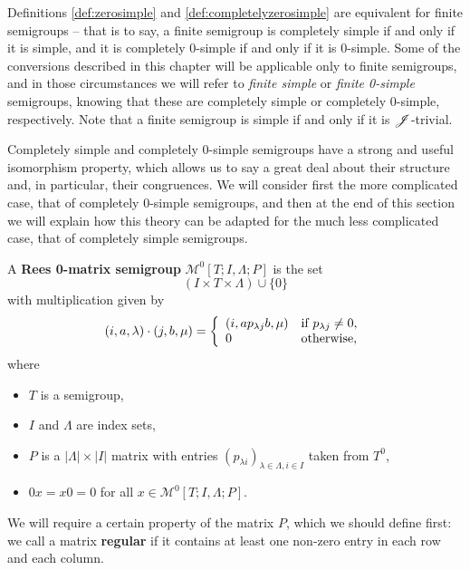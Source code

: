 Definitions \ref{def:zerosimple} and \ref{def:completelyzerosimple} are
equivalent for finite semigroups -- that is to say, a finite semigroup is
completely simple if and only if it is simple, and it is completely 0-simple if
and only if it is 0-simple.  Some of the conversions described in this chapter
will be applicable only to finite semigroups, and in those circumstances we will
refer to \textit{finite simple} or \textit{finite 0-simple} semigroups, knowing
that these are completely simple or completely 0-simple, respectively.
Note that a finite semigroup is simple if and only if it is $\mathrel{\mathscr{J}}$-trivial.

Completely simple and completely 0-simple semigroups have a strong and useful
isomorphism property, which allows us to say a great deal about their structure
and, in particular, their congruences.  We will consider first the more
complicated case, that of completely 0-simple semigroups, and then at the end of
this section we will explain how this theory can be adapted for the much less
complicated case, that of completely simple semigroups.

\begin{definition}
  \label{def:rzms}
  A \textbf{Rees 0-matrix semigroup} $\mathcal{M}^0[T;I,\Lambda;P]$ is the set
  $$(I \times T \times \Lambda) \cup \{0\}$$
  with multiplication given by
  $$(i,a,\lambda) \cdot (j,b,\mu) = \left\{
    \begin{array}{l l}
      (i,ap_{\lambda j}b, \mu) & \text{if~} p_{\lambda j} \neq 0, \\
      0 & \text{otherwise,}
    \end{array}
  \right.$$
  where
  \begin{itemize}
  \item $T$ is a semigroup,
  \item $I$ and $\Lambda$ are index sets,
  \item $P$ is a $|\Lambda| \times |I|$ matrix with entries $(p_{\lambda
      i})_{\lambda \in \Lambda, i \in I}$
    taken from $T^0$,
  \item $0x=x0=0$ for all $x \in \mathcal{M}^0[T;I,\Lambda;P]$.
  \end{itemize}
\end{definition}

We will require a certain property of the matrix $P$, which we should define
first: we call a matrix \textbf{regular}  if it contains
at least one non-zero entry in each row and each column.

